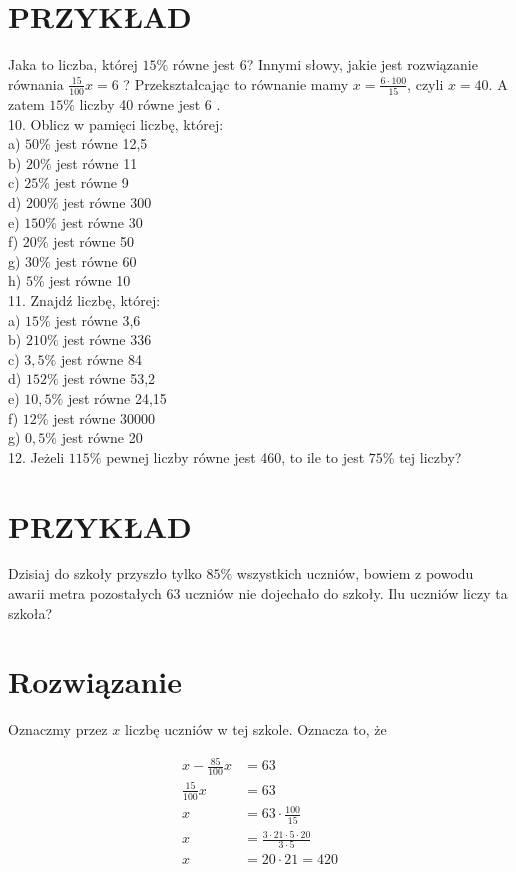 \documentclass[10pt]{article}
\begin{document}
\section*{PRZYKŁAD}
Jaka to liczba, której \(15 \%\) równe jest 6? Innymi słowy, jakie jest rozwiązanie równania \(\frac{15}{100} x=6\) ? Przekształcając to równanie mamy \(x=\frac{6 \cdot 100}{15}\), czyli \(x=40\). A zatem \(15 \%\) liczby 40 równe jest 6 .\\
10. Oblicz w pamięci liczbę, której:\\
a) \(50 \%\) jest równe 12,5\\
b) \(20 \%\) jest równe 11\\
c) \(25 \%\) jest równe 9\\
d) \(200 \%\) jest równe 300\\
e) \(150 \%\) jest równe 30\\
f) \(20 \%\) jest równe 50\\
g) \(30 \%\) jest równe 60\\
h) \(5 \%\) jest równe 10\\
11. Znajdź liczbę, której:\\
a) \(15 \%\) jest równe 3,6\\
b) \(210 \%\) jest równe 336\\
c) \(3,5 \%\) jest równe 84\\
d) \(152 \%\) jest równe 53,2\\
e) \(10,5 \%\) jest równe 24,15\\
f) \(12 \%\) jest równe 30000\\
g) \(0,5 \%\) jest równe 20\\
12. Jeżeli \(115 \%\) pewnej liczby równe jest 460, to ile to jest \(75 \%\) tej liczby?

\section*{PRZYKŁAD}
Dzisiaj do szkoły przyszło tylko \(85 \%\) wszystkich uczniów, bowiem z powodu awarii metra pozostałych 63 uczniów nie dojechało do szkoły. Ilu uczniów liczy ta szkoła?

\section*{Rozwiązanie}
Oznaczmy przez \(x\) liczbę uczniów w tej szkole. Oznacza to, że

\[
\begin{aligned}
x-\frac{85}{100} x & =63 \\
\frac{15}{100} x & =63 \\
x & =63 \cdot \frac{100}{15} \\
x & =\frac{3 \cdot 21 \cdot 5 \cdot 20}{3 \cdot 5} \\
x & =20 \cdot 21=420
\end{aligned}
\]
\end{document}
